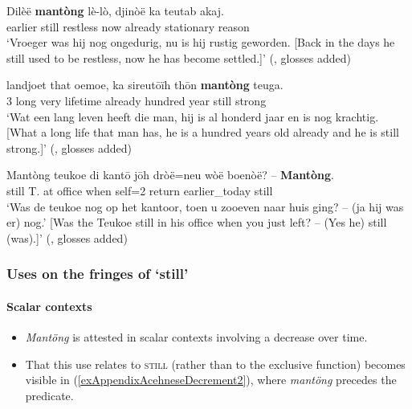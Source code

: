 \begin{exe}
	\ex\label{exAppendixAcehneseStill2}
	\gll Dilèë \textbf{mantòng} lè-lò, djinòë ka teutab akaj.\\
	earlier still restless now already stationary reason\\
	\glt \lq Vroeger was hij nog ongedurig, nu is hij rustig geworden. [Back in the days he still used to be restless, now he has become settled.]' (\cite[1046]{DjajadiningratVol2}, glosses added)

	\ex\label{exAppendixAcehneseStill3}
	 landjoet that oemoe, ka sireutōïh thōn \textbf{mantòng} teuga.\\
	3 long very lifetime already hundred year still strong\\
	\glt \lq Wat een lang leven heeft die man, hij is al honderd jaar en is nog krachtig. [What a long life that man has, he is a hundred years old already and he is still strong.]\rq{ }(\cite[882]{DjajadiningratVol1}, glosses added)

	\ex\label{exAppendixAcehneseStill4}
	\gll Mantòng teukoe di kantō jōh dròë=neu wòë boenòë? – \textbf{Mantòng}.\\
	still T. at office when self=2 return earlier\_today {} still\\
	\glt \lq Was de teukoe nog op het kantoor, toen u zooeven naar huis ging? -- (ja hij was er) nog.' [Was the Teukoe still in his office when you just left?  -- (Yes he) still (was).]\rq{ }(\cite[30]{DjajadiningratVol2}, glosses added)
\end{exe}

\subsubsection{Uses on the fringes of \lq{}still\rq{}}
\paragraph{Scalar contexts}\label{appendixAcehneseScalar}
\begin{itemize}
	\item \textit{Mantöng} is attested in scalar contexts involving a decrease over time.
	\item That this use relates to \textsc{still} (rather than to the exclusive function) becomes visible in (\ref{exAppendixAcehneseDecrement2}), where \textit{mantöng} precedes the predicate.
\end{itemize}

